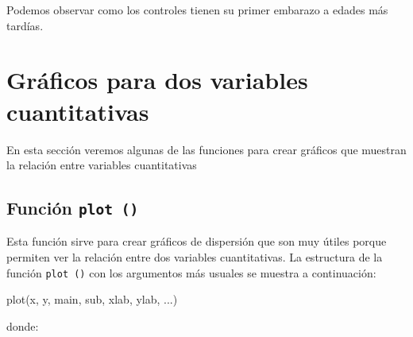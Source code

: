 \documentclass[
]{book}
\newenvironment{Shaded}{\begin{snugshade}}{\end{snugshade}}
\newcommand{\FunctionTok}[1]{\textcolor[rgb]{0.00,0.00,0.00}{#1}}
\newcommand{\NormalTok}[1]{#1}
\begin{document}
Podemos observar como los controles tienen su primer embarazo a edades más tardías.

\hypertarget{gruxe1ficos-para-dos-variables-cuantitativas}{%
\section{Gráficos para dos variables cuantitativas}\label{gruxe1ficos-para-dos-variables-cuantitativas}}

En esta sección veremos algunas de las funciones para crear gráficos que muestran la relación entre variables cuantitativas

\hypertarget{funciuxf3n-plot}{%
\subsection{\texorpdfstring{Función \texttt{plot\ ()}}{Función plot ()}}\label{funciuxf3n-plot}}

Esta función sirve para crear gráficos de dispersión que son muy útiles porque permiten ver la relación entre dos variables cuantitativas. La estructura de la función \texttt{plot\ ()} con los argumentos más usuales se muestra a continuación:

\begin{Shaded}
\begin{Highlighting}[]
\FunctionTok{plot}\NormalTok{(x, y, main, sub, xlab, ylab, ...)}
\end{Highlighting}
\end{Shaded}

donde:
\end{document}
